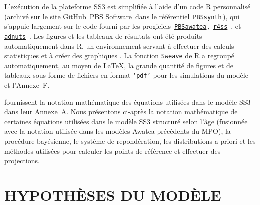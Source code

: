 \documentclass[11pt]{book}
\newcommand{\angL}{\guillemotleft\,}
\newcommand{\angR}{\,\guillemotright}
\newcommand{\code}[1]{\normalsize\texttt{#1}\normalsize}%
\newcommand{\AppRes}{Annexe~F}
\begin{document}
L'ex\'{e}cution de la plateforme SS3 est simplifi\'{e}e \`{a} l'aide d'un code R personnalis\'{e} (archiv\'{e} sur le site GitHub \angL{}\href{https://github.com/pbs-software}{PBS Software}\angR{} dans le r\'{e}f\'{e}rentiel \angL{}\href{https://github.com/pbs-software/pbs-synth}{\code{PBSsynth}}\angR{}), qui s'appuie largement sur le code fourni par les progiciels \angL{}\href{https://github.com/pbs-software/pbs-awatea}{\code{PBSawatea}}\angR{}, \angL{}\href{https://github.com/r4ss/r4ss}{\code{r4ss}}\angR{} \citep{R:2020_r4ss}, et \angL{}\href{https://github.com/Cole-Monnahan-NOAA/adnuts}{\code{adnuts}}\angR{} \citep{R:2018_adnuts}.
Les figures et les tableaux de r\'{e}sultats ont \'{e}t\'{e} produits automatiquement dans R, un environnement servant \`{a} effectuer des calculs statistiques et \`{a} cr\'{e}er des graphiques \citep{R:2021_base}. 
La fonction \code{Sweave} de R \citep{Leisch:2002} a regroup\'{e} automatiquement, au moyen de \LaTeX, la grande quantit\'{e} de figures et de tableaux sous forme de fichiers en format \code{`pdf'} pour les simulations du mod\`{e}le et l'\AppRes.

\citet{Methot-Wetzel:2013} fournissent la notation math\'{e}matique des \'{e}quations utilis\'{e}es dans le mod\`{e}le SS3 dans leur  \href{https://sedarweb.org/docs/wsupp/S39_RD_08_Methot_and_Wetzel_2013_Fish_Res_App_A.pdf}{Annexe~A}.
Nous pr\'{e}sentons ci-apr\`{e}s la notation math\'{e}matique de certaines \'{e}quations utilis\'{e}es dans le mod\`{e}le SS3 structur\'{e} selon l'\^{a}ge (fusionn\'{e}e avec la notation utilis\'{e}e dans les mod\`{e}les Awatea pr\'{e}c\'{e}dents du MPO), la proc\'{e}dure bay\'{e}sienne, le syst\`{e}me de repond\'{e}ration, les distributions a priori et les m\'{e}thodes utilis\'{e}es pour calculer les points de r\'{e}f\'{e}rence et effectuer des projections.

\section{HYPOTH\`{E}SES DU MOD\`{E}LE}
\end{document}
